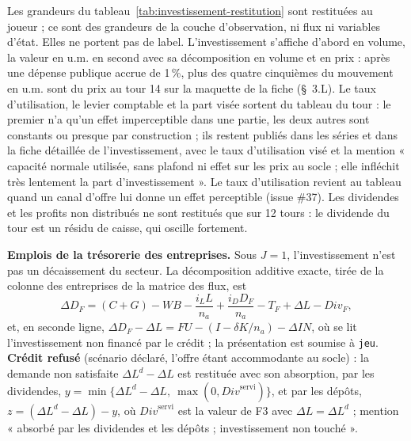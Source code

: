 \documentclass[11pt,a4paper]{article}
\begin{document}
\begin{proposee}
Les grandeurs du tableau~\ref{tab:investissement-restitution} sont restituées au joueur ; ce sont des grandeurs de la couche d'observation, ni flux ni variables d'état. Elles ne portent pas de label. L'investissement s'affiche d'abord en volume, la valeur en u.m. en second avec sa décomposition en volume et en prix : après une dépense publique accrue de 1\,\%, plus des quatre cinquièmes du mouvement en u.m. sont du prix au tour 14 sur la maquette de la fiche (\S~3.L). Le taux d'utilisation, le levier comptable et la part visée sortent du tableau du tour : le premier n'a qu'un effet imperceptible dans une partie, les deux autres sont constants ou presque par construction ; ils restent publiés dans les séries et dans la fiche détaillée de l'investissement, avec le taux d'utilisation visé et la mention « capacité normale utilisée, sans plafond ni effet sur les prix au socle ; elle infléchit très lentement la part d'investissement ». Le taux d'utilisation revient au tableau quand un canal d'offre lui donne un effet perceptible (issue \#37). Les dividendes et les profits non distribués ne sont restitués que sur 12 tours : le dividende du tour est un résidu de caisse, qui oscille fortement.

\textbf{Emplois de la trésorerie des entreprises.} Sous $J = 1$, l'investissement n'est pas un décaissement du secteur. La décomposition additive exacte, tirée de la colonne des entreprises de la matrice des flux, est
\begin{equation*}
\Delta D_{F} = (C + G) - \mathit{WB} - \frac{i_L L}{n_a} + \frac{i_D D_F}{n_a} - T_F + \Delta L - \mathit{Div}_F ,
\end{equation*}
et, en seconde ligne, $\Delta D_F - \Delta L = \mathit{FU} - (I - \delta K/n_a) - \Delta\mathit{IN}$, où se lit l'investissement non financé par le crédit ; la présentation est soumise à \texttt{jeu}. \textbf{Crédit refusé} (scénario déclaré, l'offre étant accommodante au socle) : la demande non satisfaite $\Delta L^d - \Delta L$ est restituée avec son absorption, par les dividendes, $y = \min\{\Delta L^d - \Delta L,\ \max(0, \mathit{Div}^{\mathrm{servi}})\}$, et par les dépôts, $z = (\Delta L^d - \Delta L) - y$, où $\mathit{Div}^{\mathrm{servi}}$ est la valeur de F3 avec $\Delta L = \Delta L^d$ ; mention « absorbé par les dividendes et les dépôts ; investissement non touché ».


\end{proposee}
\end{document}
